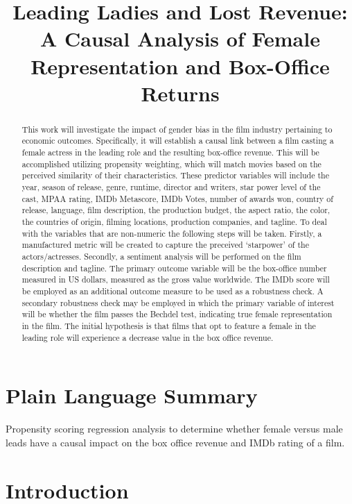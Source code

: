 \documentclass[
]{agujournal2019}
\begin{document}
\title{Leading Ladies and Lost Revenue: A Causal Analysis of Female
Representation and Box-Office Returns}



\begin{abstract}
This work will investigate the impact of gender bias in the film
industry pertaining to economic outcomes. Specifically, it will
establish a causal link between a film casting a female actress in the
leading role and the resulting box-office revenue. This will be
accomplished utilizing propensity weighting, which will match movies
based on the perceived similarity of their characteristics. These
predictor variables will include the year, season of release, genre,
runtime, director and writers, star power level of the cast, MPAA
rating, IMDb Metascore, IMDb Votes, number of awards won, country of
release, language, film description, the production budget, the aspect
ratio, the color, the countries of origin, filming locations, production
companies, and tagline. To deal with the variables that are non-numeric
the following steps will be taken. Firstly, a manufactured metric will
be created to capture the preceived `starpower' of the actors/actresses.
Secondly, a sentiment analysis will be performed on the film description
and tagline. The primary outcome variable will be the box-office number
measured in US dollars, measured as the gross value worldwide. The IMDb
score will be employed as an additional outcome measure to be used as a
robustness check. A secondary robustness check may be employed in which
the primary variable of interest will be whether the film passes the
Bechdel test, indicating true female representation in the film. The
initial hypothesis is that films that opt to feature a female in the
leading role will experience a decrease value in the box office revenue.
\end{abstract}

\section*{Plain Language Summary}
Propensity scoring regression analysis to determine whether female
versus male leads have a causal impact on the box office revenue and
IMDb rating of a film.




\section{Introduction}\label{introduction}
\end{document}
